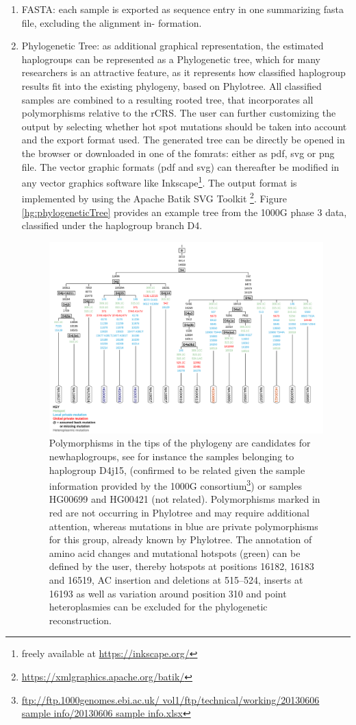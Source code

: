 \begin{enumerate}
\item  FASTA: each sample is exported as sequence entry in one summarizing fasta file, excluding the alignment in- formation.
\item Phylogenetic Tree: as additional graphical representation, the estimated haplogroups can be represented as a Phylogenetic tree, which for many researchers is an attractive feature, as it represents how classified haplogroup results fit into the existing phylogeny, based on Phylotree. All classified samples are combined to a resulting rooted tree, that incorporates all polymorphisms relative to the rCRS. The user can further customizing the output by selecting whether hot spot mutations should be taken into account and the export format used. The generated tree can be directly be opened in the browser or downloaded in one of the fomrats: either as pdf, svg or png file. The vector graphic formats (pdf and svg) can thereafter be modified in any vector graphics software like Inkscape\footnote{freely available at \url{https://inkscape.org/}}. The output format is implemented by using the Apache Batik SVG Toolkit \footnote{\url{https://xmlgraphics.apache.org/batik/}}. Figure \ref{hg:phylogeneticTree} provides an example tree from the 1000G phase 3 data, classified under the haplogroup branch D4.
\begin{figure}[!ht]
    \centering
    \includegraphics[width=1\textwidth]{images/tree.png}
    \caption[Export of Graphical Phylogenetic Tree]{Polymorphisms in the tips of the phylogeny are candidates for newhaplogroups, see for instance the samples belonging to haplogroup D4j15, (confirmed to be related given the sample information provided by the 1000G consortium\footnote{\url{ftp://ftp.1000genomes.ebi.ac.uk/ vol1/ftp/technical/working/20130606 sample info/20130606 sample info.xlsx}}) or samples HG00699 and HG00421 (not related). Polymorphisms marked in red are not occurring in Phylotree and may require additional attention, whereas mutations in blue are private polymorphisms for this group, already known by Phylotree. The annotation of amino acid changes and mutational hotspots (green) can be defined by the user, thereby hotspots at positions 16182, 16183 and 16519, AC insertion and deletions at 515–524, inserts at 16193 as well as variation around position 310 and point heteroplasmies can be excluded for the phylogenetic reconstruction. } 

\end{figure}
\end{enumerate}
